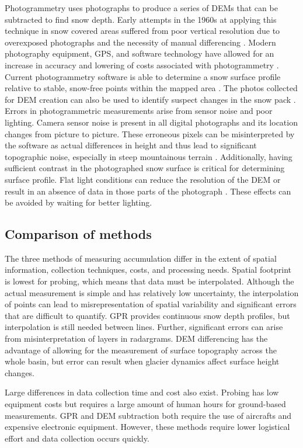 \documentclass{sfuthesis}
\begin{document}
Photogrammetry uses photographs to produce a series of DEMs that can be subtracted to find snow depth. Early attempts in the 1960s at applying this technique in snow covered areas suffered from poor vertical resolution due to overexposed photographs and the necessity of manual differencing \citep{Nolan2015}. Modern photography equipment, GPS, and software technology have allowed for an increase in accuracy and lowering of costs associated with photogrammetry \citep{Nolan2015}. Current photogrammetry software is able to determine a snow surface profile relative to stable, snow-free points within the mapped area \citep{Farinotti2010}. The photos collected for DEM creation can also be used to identify suspect changes in the snow pack \citep{Nolan2015}.
Errors in photogrammetric measurements arise from sensor noise and poor lighting. Camera sensor noise is present in all digital photographs and its location changes from picture to picture. These erroneous pixels can be misinterpreted by the software as actual differences in height and thus lead to significant topographic noise, especially in steep mountainous terrain \citep{Nolan2015}. Additionally, having sufficient contrast in the photographed snow surface is critical for determining surface profile. Flat light conditions can reduce the resolution of the DEM or result in an absence of data in those parts of the photograph \citep{Nolan2015}. These effects can be avoided by waiting for better lighting. 

\subsection{Comparison of methods}
\label{sec:comparemethods}
The three methods of measuring accumulation differ in the extent of spatial information, collection techniques, costs, and processing needs. Spatial footprint is lowest for probing, which means that data must be interpolated. Although the actual measurement is simple and has relatively low uncertainty, the interpolation of points can lead to misrepresentation of spatial variability and significant errors that are difficult to quantify. GPR provides continuous snow depth profiles, but interpolation is still needed between lines. Further, significant errors can arise from misinterpretation of layers in radargrams. DEM differencing has the advantage of allowing for the measurement of surface topography across the whole basin, but error can result when glacier dynamics affect surface height changes. 

Large differences in data collection time and cost also exist. Probing has low equipment costs but requires a large amount of human hours for ground-based measurements. GPR and DEM subtraction both require the use of aircrafts and expensive electronic equipment. However, these methods require lower logistical effort and data collection occurs quickly.  
\end{document}
